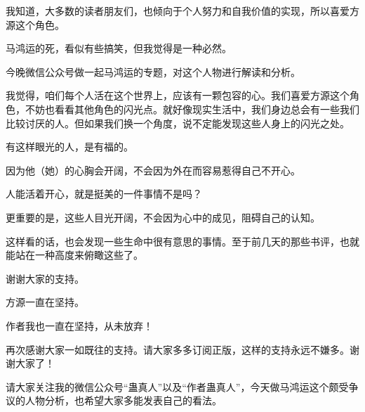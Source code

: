 \begin{this_body}
我知道，大多数的读者朋友们，也倾向于个人努力和自我价值的实现，所以喜爱方源这个角色。

马鸿运的死，看似有些搞笑，但我觉得是一种必然。

今晚微信公众号做一起马鸿运的专题，对这个人物进行解读和分析。

我觉得，咱们每个人活在这个世界上，应该有一颗包容的心。我们喜爱方源这个角色，不妨也看看其他角色的闪光点。就好像现实生活中，我们身边总会有一些我们比较讨厌的人。但如果我们换一个角度，说不定能发现这些人身上的闪光之处。

有这样眼光的人，是有福的。

因为他（她）的心胸会开阔，不会因为外在而容易惹得自己不开心。

人能活着开心，就是挺美的一件事情不是吗？

更重要的是，这些人目光开阔，不会因为心中的成见，阻碍自己的认知。

这样看的话，也会发现一些生命中很有意思的事情。至于前几天的那些书评，也就能站在一种高度来俯瞰这些了。

谢谢大家的支持。

方源一直在坚持。

作者我也一直在坚持，从未放弃！

再次感谢大家一如既往的支持。请大家多多订阅正版，这样的支持永远不嫌多。谢谢大家了！

请大家关注我的微信公众号“蛊真人”以及“作者蛊真人”，今天做马鸿运这个颇受争议的人物分析，也希望大家多能发表自己的看法。

\end{this_body}

